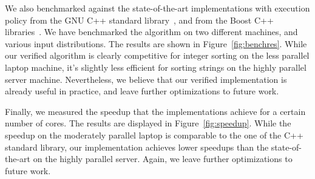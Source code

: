 \documentclass[a4paper,UKenglish,cleveref, autoref, thm-restate]{lipics-v2021}
\begin{document}
  We also benchmarked against the state-of-the-art implementations  with execution policy  from the
  GNU C++ standard library~\cite{libstdc++},
  and  from the Boost C++ libraries~\cite{boost,boost-sort}.
  We have benchmarked the algorithm on two different machines, and various input distributions. The results are shown in Figure~\ref{fig:benchres}.
  While our verified algorithm is clearly competitive for integer sorting on the less parallel laptop
  machine, it's slightly less efficient for sorting strings on the highly parallel server machine.
  Nevertheless, we believe that our verified implementation is already useful in practice,
  and leave further optimizations to future work.

  Finally, we measured the speedup that the implementations achieve for a certain number of cores.
  The results are displayed in Figure~\ref{fig:speedup}. While the speedup on the moderately parallel
  laptop is comparable to the one of the C++ standard library, our implementation
  achieves lower speedups than the state-of-the-art on the highly parallel server.
  Again, we leave further optimizations to future work.



%
%
%
\end{document}
